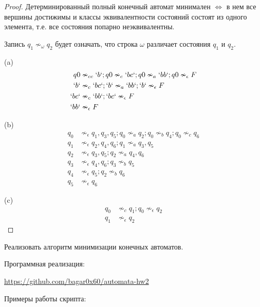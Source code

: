 \begin{proof}
    Детерминированный полный конечный автомат минимален $\Leftrightarrow$ 
    в нем все вершины достижимы и классы эквивалентности состояний 
    состоят из одного элемента, т.е. все состояния попарно неэквивалентны.

    Запись $q_1 \nsim_{\omega} q_2$ будет означать, 
    что строка $\omega$ различает состояния $q_1$ и $q_2$.  

    (a)
    \begin{align*}
        q0 &\nsim_{cc} \lq{b}\lq; q0 \nsim_{c} \lq bc \lq; q0 \nsim_{a} \lq bb \lq; q0 \nsim_{\epsilon} F \\
        \lq b \lq &\nsim_{c} \lq bc \lq; \lq b \lq \nsim_{a} \lq bb \lq; \lq b \lq \nsim_{\epsilon} F \\
        \lq bc \lq &\nsim_{c} \lq bb \lq; \lq bc \lq \nsim_{\epsilon} F \\
        \lq bb \lq &\nsim_{\epsilon} F
    \end{align*}

    (b)
    \begin{align*}
        q_0 &\nsim_{\epsilon} q_1, q_3, q_5; q_0 \nsim_{a} q_2; q_0 \nsim_{b} q_4; q_0 \nsim_{c} q_6   \\
        q_1 &\nsim_{\epsilon} q_2, q_4, q_6; q_1 \nsim_{a} q_3, q_5 \\
        q_2 &\nsim_{\epsilon} q_3, q_5; q_2 \nsim_{a} q_4, q_6 \\
        q_3 &\nsim_{\epsilon} q_4, q_6; q_3 \nsim_{b} q_5 \\
        q_4 &\nsim_{\epsilon} q_5; q_2 \nsim_{b} q_6 \\
        q_5 &\nsim_{\epsilon} q_6
    \end{align*}

    (c)
    \begin{align*}
        q_0 &\nsim_{c} q_1; q_0 \nsim_{\epsilon} q_2 \\
        q_1 &\nsim_{\epsilon} q_2
    \end{align*}
\end{proof}

\begin{problem}
    Реализовать алгоритм минимизации конечных автоматов.
\end{problem}

Программная реализация:

\url{https://github.com/bagar0x60/automata-hw2}
\break

Примеры работы скрипта:

